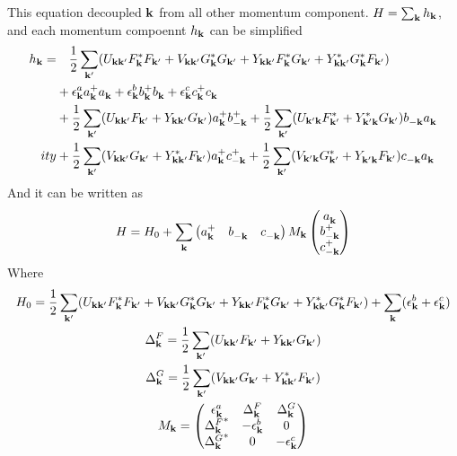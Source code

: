 This equation decoupled $\vk$ from all other momentum component.  $H=\sum_{\vk}h_{\vk}$, and each momentum compoennt $h_{\vk}$ can be simplified 
\begin{equation*}
\begin{split}
 h_{\vk}=&\quad\nth{2}\sum_{\vk'}(U_{\vk\vk'}F_{\vk}^{*}F_{\vk'}+V_{\vk\vk'}G_{\vk}^{*}G_{\vk'}
 +Y_{\vk\vk'}F_{\vk}^{*}G_{\vk'}+Y^*_{\vk\vk'}G_{\vk}^{*}F_{\vk'})\\
 &+\epsilon^a_\vk{}a^+_\vk{}a^{}_\vk+\epsilon^b_\vk{}b^+_\vk{}b^{}_\vk+\epsilon^c_\vk{}c^+_\vk{}c^{}_\vk\\
  &+\nth{2}\sum_{\vk'}(U_{\vk\vk'}F_{\vk'}+Y_{\vk\vk'}G_{\vk'})a^+_\vk{}b^+_{-\vk}{}+\nth{2}\sum_{\vk'}(U_{\vk'\vk}F^{*}_{\vk'}+Y^{*}_{\vk'\vk}G_{\vk'})b^{}_{-\vk}a^{}_{\vk}\\
ity  &+\nth{2}\sum_{\vk'}(V_{\vk\vk'}G_{\vk'}+Y^{*}_{\vk\vk'}F_{\vk'})a^+_\vk{}c^+_{-\vk}{}+\nth{2}\sum_{\vk'}(V_{\vk'\vk}G^{*}_{\vk'}+Y^{}_{\vk'\vk}F_{\vk'})c^{}_{-\vk}a^{}_{\vk}
    \end{split} 
\end{equation*}
And it can be written as 
\begin{equation}\label{eq:threeLinearized}
H=H_{0}+\sum_{\vk}\begin{pmatrix}a^{+}_{\vk}&b^{}_{-\vk}&c^{}_{-\vk}\end{pmatrix}
M_{\vk}
  \begin{pmatrix}a^{}_{\vk}\\b^{+}_{-\vk}\\c^{+}_{-\vk}\end{pmatrix}
\end{equation}
Where 
\begin{gather}
H_{0}=\nth{2}\sum_{\vk'}(U_{\vk\vk'}F_{\vk}^{*}F_{\vk'}+V_{\vk\vk'}G_{\vk}^{*}G_{\vk'}
 +Y_{\vk\vk'}F_{\vk}^{*}G_{\vk'}+Y^*_{\vk\vk'}G_{\vk}^{*}F_{\vk'})+\sum_{\vk}(\epsilon^{b}_{\vk}+\epsilon^{c}_{\vk})\\
 \Delta^{F}_{\vk}=\nth{2}\sum_{\vk'}(U_{\vk\vk'}F_{\vk'}+Y_{\vk\vk'}G_{\vk'})\\
  \Delta^{G}_{\vk}=\nth{2}\sum_{\vk'}(V_{\vk\vk'}G_{\vk'}+Y^{*}_{\vk\vk'}F_{\vk'})\\
  M_{\vk}=\begin{pmatrix}
  \epsilon^{a}_{\vk}&\Delta^{F}_{\vk}&\Delta^{G}_{\vk}\\
  {\Delta^{F}_{\vk}}^{*}&-\epsilon^{b}_{\vk}&0\\
   {\Delta^{G}_{\vk}}^{*}&0&-\epsilon^{c}_{\vk}\\
  \end{pmatrix}\label{eq:canonical:M}
\end{gather}
